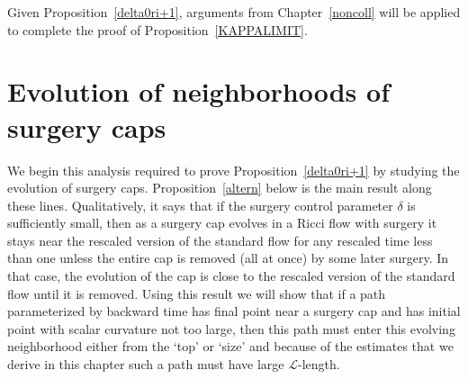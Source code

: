 Given Proposition~\ref{delta0ri+1},  arguments from
Chapter~\ref{noncoll} will be applied to complete the proof of
Proposition~\ref{KAPPALIMIT}.




\section{Evolution of neighborhoods of surgery caps}


 We begin this analysis required to prove Proposition~\ref{delta0ri+1}
 by studying the
evolution of surgery caps.
Proposition~\ref{altern} below is the main result along these lines.
Qualitatively, it says that if the surgery control parameter
$\delta$ is sufficiently small, then as a surgery cap evolves in a
Ricci flow with surgery it stays near the rescaled version of the
standard flow for any rescaled time less than one unless the entire
cap is removed (all at once) by some later surgery. In that case,
the evolution of the cap is close to the rescaled version of the
standard flow until it is removed. Using this result we will show
that if a path parameterized by backward time has final point  near
a surgery cap and has initial point with scalar curvature not too
large, then this path must enter this evolving neighborhood either
from the `top' or `size' and because of the estimates that we derive
in this chapter such a path  must have large ${\mathcal L}$-length.



